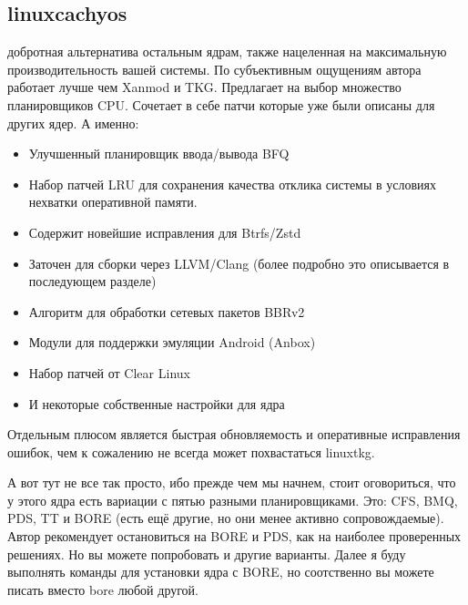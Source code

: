 \documentclass[letterpaper,10pt,russian,openany]{sphinxmanual}
\begin{document}
\subsection{linux\sphinxhyphen{}cachyos}
\label{\detokenize{source/custom-kernels:linux-cachyos}}\label{\detokenize{source/custom-kernels:index-5}}\label{\detokenize{source/custom-kernels:id7}}
\sphinxAtStartPar
{} \sphinxhyphen{} добротная альтернатива
остальным ядрам, также нацеленная на максимальную производительность вашей системы.
По субъективным ощущениям автора работает лучше чем Xanmod и TKG. Предлагает на выбор множество
планировщиков CPU. Сочетает в себе патчи которые уже были описаны для других ядер. А именно:
\begin{itemize}
\item {} 
\sphinxAtStartPar
Улучшенный планировщик ввода/вывода BFQ

\item {} 
\sphinxAtStartPar
Набор патчей LRU для сохранения качества отклика системы в условиях нехватки оперативной памяти.

\item {} 
\sphinxAtStartPar
Содержит новейшие исправления для Btrfs/Zstd

\item {} 
\sphinxAtStartPar
Заточен для сборки через LLVM/Clang (более подробно это описывается в последующем разделе)

\item {} 
\sphinxAtStartPar
Алгоритм для обработки сетевых пакетов BBRv2

\item {} 
\sphinxAtStartPar
Модули для поддержки эмуляции Android (Anbox)

\item {} 
\sphinxAtStartPar
Набор патчей от Clear Linux

\item {} 
\sphinxAtStartPar
И некоторые собственные настройки для ядра

\end{itemize}

\sphinxAtStartPar
Отдельным плюсом является быстрая обновляемость и оперативные исправления ошибок,
чем к сожалению не всегда может похвастаться linux\sphinxhyphen{}tkg.

\sphinxAtStartPar
{}

\sphinxAtStartPar
А вот тут не все так просто, ибо прежде чем мы начнем, стоит оговориться,
что у этого ядра есть вариации с пятью разными планировщиками. Это: CFS,
BMQ, PDS, TT и BORE (есть ещё другие, но они менее активно сопровождаемые).
Автор рекомендует остановиться на BORE и PDS, как на наиболее проверенных
решениях. Но вы можете попробовать и другие варианты. Далее я буду выполнять
команды для установки ядра с BORE, но соотственно вы можете писать вместо bore
любой другой.
\end{document}
